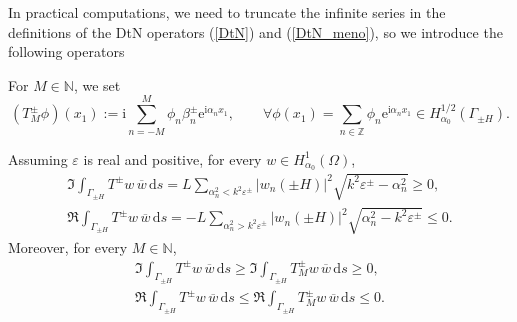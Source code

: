 \documentclass[a4paper,10pt]{article}
\newcommand{\IN}{{\mathbb N}}
\newcommand{\IZ}{{\mathbb Z}}
\newcommand{\ri}{{\mathrm i}}
\newcommand{\re}{{\mathrm e}}
\newcommand{\rd}{{\,\mathrm d}}
\newcommand{\cw}{{\overline{w}}}
\newcommand{\GpmH}{{\Gamma_{\pm H}}}
\begin{document}
In practical computations, we need to truncate the infinite series in the definitions of the DtN operators (\ref{DtN}) and (\ref{DtN_meno}), so we introduce the following operators

\begin{defin}\label{def:TruncatedDtN}
For $M\in\IN$, we set
\begin{equation} \label{DtN_trunc}
	(T_M^\pm \phi)(x_1) := \ri \sum_{n=-M}^M \phi_n \beta_n^\pm \re^{\ri\alpha_nx_1},
	\qquad\forall \phi(x_1)=\sum_{n\in\IZ}\phi_n\re^{\ri\alpha_nx_1} \in H^{1/2}_{\alpha_0}(\GpmH).
\end{equation}
\end{defin}

\begin{lem} \label{lemma:l2prod}
Assuming $\varepsilon$ is real and positive, for every $w \in H^1_{\alpha_0} (\Omega)$,
\begin{align}\label{eq:ImT}
	\Im \int_\GpmH T^\pm w \, \cw  \rd s =
	L\sum_{\alpha^2_n < k^2\varepsilon^\pm} |w_n(\pm H)|^2 \sqrt{k^2\varepsilon^\pm-\alpha_n^2} \geq 0,\\ \label{eq:ReT}
	\Re \int_\GpmH T^\pm w \, \cw  \rd s =
	-L\sum_{\alpha^2_n > k^2\varepsilon^\pm} |w_n(\pm H)|^2 \sqrt{\alpha_n^2-k^2\varepsilon^\pm} \leq 0.
\end{align}
Moreover, for every $M \in \IN$,
\begin{align}
	\Im \int_\GpmH T^\pm w \, \cw  \rd s \geq \Im \int_\GpmH T_M^\pm w \, \cw  \rd s \geq 0,\\ 
	\Re \int_\GpmH T^\pm w \, \cw  \rd s \leq \Re \int_\GpmH T_M^\pm w \, \cw  \rd s \leq 0.
\end{align}
\end{lem}
\end{document}
